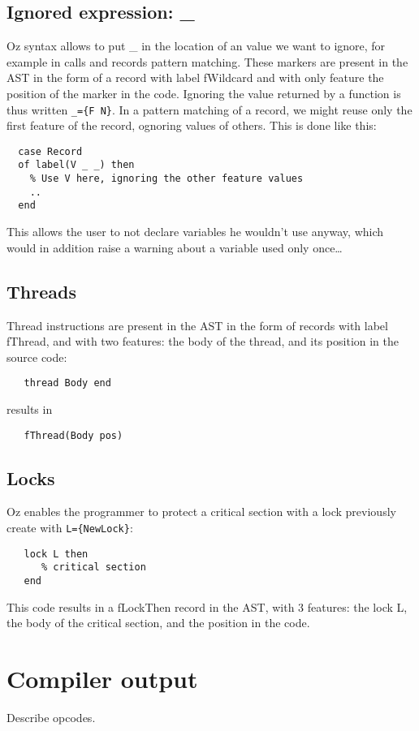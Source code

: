 \documentclass[a4paper]{memoir}
\begin{document}
\subsection{Ignored expression: \_}
Oz syntax allows to put \_ in the location of an value we want to ignore, for example in calls and records pattern matching. These markers are present in the AST in the form of a record with label fWildcard and with only feature the position of the marker in the code.
Ignoring the value returned by a function is thus written \lstinline!_={F N}!. In a pattern matching of a record, we might reuse only the first feature of the record, ognoring values of others. This is done like this:
\begin{lstlisting}
  case Record 
  of label(V _ _) then
    % Use V here, ignoring the other feature values
    ..
  end
\end{lstlisting}
This allows the user to not declare variables he wouldn't use anyway, which would in addition raise a warning about a variable used only once\ldots

\subsection{Threads}
Thread instructions are present in the AST in the form of records with label fThread, and with two features: the body of the thread, and its position in the source code:
\begin{lstlisting}
   thread Body end
\end{lstlisting}
results in
\begin{lstlisting}
   fThread(Body pos)
\end{lstlisting}
\subsection{Locks}
Oz enables the programmer to protect a critical section with a lock previously create with \lstinline!L={NewLock}!:
\begin{lstlisting}
   lock L then
      % critical section
   end
\end{lstlisting}

This code results in a fLockThen record in the AST, with 3 features: the lock L, the body of the critical section, and the position in the code.
\section{Compiler output}
Describe opcodes.
\end{document}
